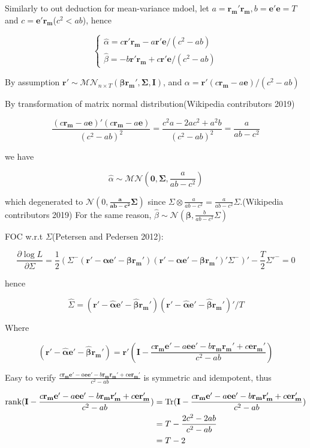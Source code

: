 \documentclass{article}
\begin{document}
Similarly to out deduction for mean-variance mdoel, let
\(a=\mathbf{r_m'r_m},b=\mathbf{e'e}=T\) and
\(c=\mathbf{e'r_m}\)(\(c^2< ab\)), hence

\[ \begin{cases}
  \hat{\alpha}=c\mathbf{r'r_m}-a\mathbf{r'e}/(c^2-ab)\\
  \hat{\beta}=-b\mathbf{r'r_m}+c\mathbf{r'e}/(c^2-ab)
\end{cases} \]

By assumption
\(\mathbf{r'}\sim \mathcal{MN}_{n\times T}(\mathbf{\beta r_m',\Sigma,I})\),
and \(\alpha=\mathbf{r'}(c\mathbf{r_m}-a\mathbf{e})/(c^2-ab)\)

By transformation of matrix normal distribution(Wikipedia contributors
2019)

\[\frac{ (c\mathbf{r_m}-a\mathbf{e})'(c\mathbf{r_m}-a\mathbf{e})}{(c^2-ab)^2}=\frac{c^2a-2ac^2+a^2b}{(c^2-ab)^2}=\frac{a}{ab-c^2} \]

we have

\[ \hat{\alpha}\sim \mathcal{MN}(\mathbf{0,\Sigma},\frac{a}{ab-c^2}) \]

which degenerated to \(\mathcal{N}(0,\mathbf{\frac{a}{ab-c^2}\Sigma})\)
since
\(\Sigma \otimes \frac{a}{ab-c^2}=\frac{a}{ab-c^2}\Sigma\).(Wikipedia
contributors 2019) For the same reason,
\(\hat{\beta}\sim\mathcal{N}(\mathbf{\beta},\frac{b}{ab-c^2}\Sigma)\)

FOC w.r.t \(\Sigma\)(Petersen and Pedersen 2012):

\[ \frac{\partial \log L}{\partial \Sigma}=\frac{1}{2}(\Sigma^-\mathbf{(r'-\alpha e'-\beta r_m')}\mathbf{(r'-\alpha e'-\beta r_m')}'\Sigma^-)'-\frac{T}{2}\Sigma'^-=0 \]

hence

\[ \hat{\Sigma}= \mathbf{(r'-\hat{\alpha} e'-\hat{\beta} r_m')}\mathbf{(r'-\hat{\alpha} e'-\hat{\beta} r_m')}'/T\]

Where

\[ \mathbf{(r'-\hat{\alpha} e'-\hat{\beta} r_m')}=\mathbf{r'}(\mathbf{I}-\frac{c\mathbf{r_me'}-a\mathbf{ee'}-b\mathbf{r_mr_m'}+c\mathbf{er_m'}}{c^2-ab}) \]

Easy to verify
\(\frac{c\mathbf{r_me'}-a\mathbf{ee'}-b\mathbf{r_mr_m'}+c\mathbf{er_m'}}{c^2-ab}\)
is symmetric and idempotent, thus

\[ \begin{aligned}
  \operatorname{rank}(\mathbf{I}-\frac{c\mathbf{r_me'}-a\mathbf{ee'}-b\mathbf{r_mr_m'}+c\mathbf{er_m'}}{c^2-ab})&=\operatorname{Tr}(\mathbf{I}-\frac{c\mathbf{r_me'}-a\mathbf{ee'}-b\mathbf{r_mr_m'}+c\mathbf{er_m'}}{c^2-ab})
  \\&=T-\frac{2c^2-2ab}{c^2-ab}
  \\&=T-2
\end{aligned} \]
\end{document}

